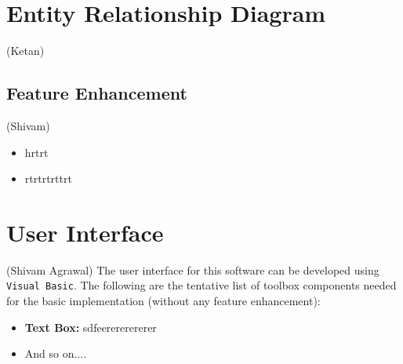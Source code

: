 \documentclass[12pt,a4paper]{article}
\begin{document}
\section{Entity Relationship Diagram}
(Ketan)

\subsection{Feature Enhancement}
(Shivam)
\begin{itemize}
    \item hrtrt
    \item rtrtrtrttrt
\end{itemize}
        
\section{User Interface}
(Shivam Agrawal)
	The user interface for this software can be developed using \texttt{Visual Basic}. The following are the tentative list of toolbox components needed for the basic implementation (without any feature enhancement):
    \begin{itemize}
        \item \textbf{Text Box:} sdfeerererererer
        \item And so on....
    \end{itemize}
\end{document}
